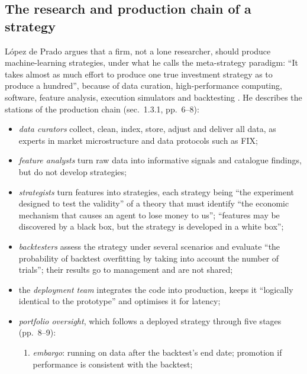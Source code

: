 \subsection{The research and production chain of a strategy}

\begin{qfmethod}\label{meth:strategy-production-lifecycle}
 López de Prado argues that a firm, not a lone researcher, should produce machine-learning strategies, under what he calls the meta-strategy paradigm: ``It takes almost as much effort to produce one true investment strategy as to produce a hundred'', because of data curation, high-performance computing, software, feature analysis, execution simulators and backtesting \citep[chap.~1, sec.~1.2.2, p.~5]{alpha-afml}. He describes the stations of the production chain (sec.~1.3.1, pp.~6--8):
\begin{itemize}
\item \emph{data curators} collect, clean, index, store, adjust and deliver all data, as experts in market microstructure and data protocols such as FIX;
\item \emph{feature analysts} turn raw data into informative signals and catalogue findings, but do not develop strategies;
\item \emph{strategists} turn features into strategies, each strategy being ``the experiment designed to test the validity'' of a theory that must identify ``the economic mechanism that causes an agent to lose money to us''; ``features may be discovered by a black box, but the strategy is developed in a white box'';
\item \emph{backtesters} assess the strategy under several scenarios and evaluate ``the probability of backtest overfitting by taking into account the number of trials''; their results go to management and are not shared;
\item the \emph{deployment team} integrates the code into production, keeps it ``logically identical to the prototype'' and optimises it for latency;
\item \emph{portfolio oversight}, which follows a deployed strategy through five stages (pp.~8--9):
  \begin{enumerate}
  \item \emph{embargo}: running on data after the backtest's end date; promotion if performance is consistent with the backtest;

\end{enumerate}
\end{itemize}
\end{qfmethod}
